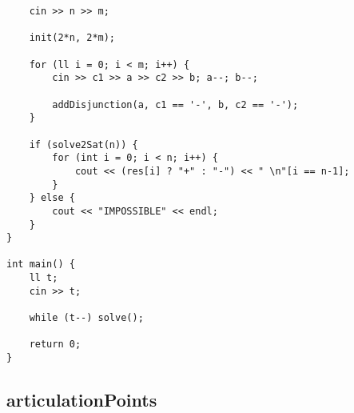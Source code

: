 \documentclass[landscape,twocolumn,10pt,a4paper]{article}
\begin{document}
\begin{verbatim}
    cin >> n >> m;

    init(2*n, 2*m);

    for (ll i = 0; i < m; i++) {
        cin >> c1 >> a >> c2 >> b; a--; b--;
        
        addDisjunction(a, c1 == '-', b, c2 == '-');
    }

    if (solve2Sat(n)) {
        for (int i = 0; i < n; i++) {
            cout << (res[i] ? "+" : "-") << " \n"[i == n-1];
        }
    } else {
        cout << "IMPOSSIBLE" << endl;
    }
}

int main() {
    ll t;
    cin >> t;

    while (t--) solve();

    return 0;
}\end{verbatim}

\subsection{articulationPoints}
\end{document}
